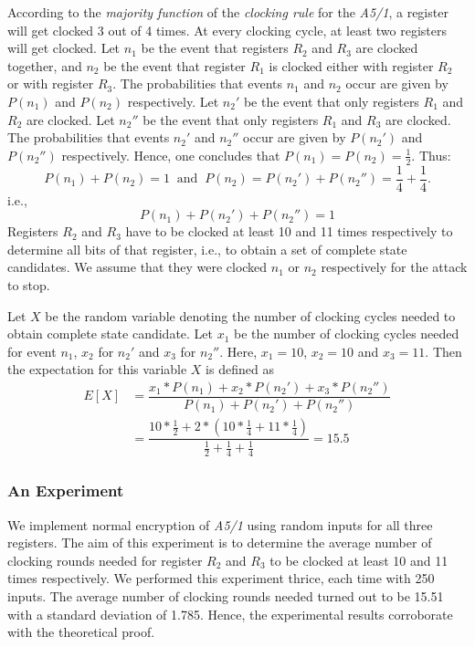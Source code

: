 \documentclass{llncs}
\begin{document}
According to the \emph{majority function} of the \emph{clocking rule} for the \emph{A5/1}, a register will get clocked 3 out of 4 times. At every clocking cycle, at least two registers will get clocked.
Let $n_{1}$ be the event that registers $R_{2}$ and $R_{3}$ are clocked together, and $n_{2}$ be the event that register $R_{1}$ is clocked either with register $R_{2}$ or with register $R_{3}$. The probabilities that events $n_{1}$ and $n_{2}$ occur are given by $P(n_{1})$ and $P(n_{2})$ respectively. Let $n_{2}'$ be the event that only registers $R_{1}$ and $R_{2}$ are clocked. Let $n_{2}''$ be the event that only registers $R_{1}$ and $R_{3}$ are clocked. The probabilities that events $n_{2}'$ and $n_{2}''$ occur are given by $P(n_{2}')$ and $P(n_{2}'')$ respectively. 
Hence, one concludes that $P(n_{1}) = P(n_{2}) = \frac{1}{2}$. Thus:
\begin{equation}
P(n_{1}) + P(n_{2}) = 1 \;\;\text{and}\;\;
P(n_{2}) = P(n_{2}')+ P(n_{2}'') = \frac{1}{4} + \frac{1}{4}.
\end{equation}
i.e.,
\[ P(n_{1}) + P(n_{2}') + P(n_{2}'') = 1 \]
Registers $R_{2}$ and $R_{3}$ have to be clocked at least 10 and 11 times respectively to determine all bits of that register, i.e., to obtain a set of complete state candidates. We assume that they were clocked $n_{1}$ or $n_{2}$ respectively for the attack to stop. 

Let $X$ be the random variable denoting the number of clocking cycles needed to obtain complete state candidate. Let $x_{1}$ be the number of clocking cycles needed for event $n_{1}$, $x_{2}$ for $n_{2}'$ and $x_{3}$ for $n_{2}''$. Here, $x_{1} = 10$, $x_{2} = 10$ and $x_{3} = 11$. Then the expectation for this variable $X$ is defined as
\begin{eqnarray*}
E[X] &= \dfrac{x_{1}* P(n_{1}) + x_{2}* P(n_{2}') + x_{3}* P(n_{2}'')}{P(n_{1}) + P(n_{2}') + P(n_{2}'')}\\ 
&=\dfrac{10* \frac{1}{2} + 2*(10* \frac{1}{4} + 11* \frac{1}{4})}{\frac{1}{2} + \frac{1}{4} + \frac{1}{4}} = 15.5 
\end{eqnarray*}
\subsubsection {An Experiment}
We implement normal encryption of \emph{A5/1} using random inputs for all three registers. The aim of this experiment is to determine the average number of clocking rounds needed for register $R_{2}$ and $R_{3}$ to be clocked at least 10 and 11 times respectively. We performed this experiment thrice, each time with 250 inputs. The average number of clocking rounds needed turned out to be 15.51 with a standard deviation of 1.785. Hence, the experimental results corroborate with the theoretical proof.
\end{document}
